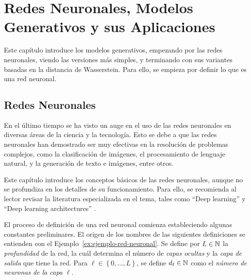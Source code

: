 \chapter{Redes Neuronales, Modelos Generativos y sus Aplicaciones}\label{chap:redes-neuronales-y-modelos-generativos}  %
Este capítulo introduce los modelos generativos, empezando por las redes neuronales, viendo las versiones más simples, y terminando con sus variantes basadas en la distancia de Wasserstein. Para ello, se empieza por definir lo que es una red neuronal.


\section{Redes Neuronales}\label{sec:redes-Neuronales}  %
En el último tiempo se ha visto un auge en el uso de las redes neuronales en diversas áreas de la ciencia y la tecnología. Esto se debe a que las redes neuronales han demostrado ser muy efectivas en la resolución de problemas complejos, como la clasificación de imágenes, el procesamiento de lenguaje natural, y la generación de texto e imágenes, entre otros.

Este capítulo introduce los conceptos básicos de las redes neuronales, aunque no se profundiza en los detalles de su funcionamiento. Para ello, se recomienda al lector revisar la literatura especializada en el tema, tales como ``Deep learning'' \cite{goodfellow2016deep} y ``Deep learning architectures'' \cite{calin2020deep}.

El proceso de definición de una red neuronal comienza estableciendo algunas constantes preliminares. El origen de los nombres de las siguientes definiciones se entienden con el Ejemplo~\ref{ex:ejemplo-red-neuronal}. Se define por $L\in\mathbb{N}$ la \emph{profundidad} de la red, la cuál determina el número de \textit{capas ocultas} y la \textit{capa de salida} que tiene la red. Para $\ell \in \left\{ 0,\ldots, L \right\}$, se define $d_\ell\in\mathbb{N}$ como el \emph{número de neuronas de la capa $\ell$}.

